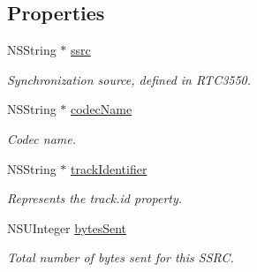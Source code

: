 \subsection*{Properties}
\begin{DoxyCompactItemize}
\item 
\mbox{\label{interface_c_c_video_sender_status_ab86e6b3305daf4898839841bd950a736}} 
N\+S\+String $\ast$ \hyperlink{interface_c_c_video_sender_status_ab86e6b3305daf4898839841bd950a736}{ssrc}
\begin{DoxyCompactList}\small\item\em Synchronization source, defined in R\+T\+C3550. \end{DoxyCompactList}\item 
\mbox{\label{interface_c_c_video_sender_status_a141c850653dd736eb352797c363d366b}} 
N\+S\+String $\ast$ \hyperlink{interface_c_c_video_sender_status_a141c850653dd736eb352797c363d366b}{codec\+Name}
\begin{DoxyCompactList}\small\item\em Codec name. \end{DoxyCompactList}\item 
\mbox{\label{interface_c_c_video_sender_status_ab8fe689cf3ef20a9fa474325896b936b}} 
N\+S\+String $\ast$ \hyperlink{interface_c_c_video_sender_status_ab8fe689cf3ef20a9fa474325896b936b}{track\+Identifier}
\begin{DoxyCompactList}\small\item\em Represents the track.\+id property. \end{DoxyCompactList}\item 
\mbox{\label{interface_c_c_video_sender_status_a8649495115b402a65c03f964b8c4e86c}} 
N\+S\+U\+Integer \hyperlink{interface_c_c_video_sender_status_a8649495115b402a65c03f964b8c4e86c}{bytes\+Sent}
\begin{DoxyCompactList}\small\item\em Total number of bytes sent for this S\+S\+RC. \end{DoxyCompactList}\item 
\mbox{\label{interface_c_c_video_sender_status_abd80886bdd428f289e94db3bb2031689}} 

\end{DoxyCompactItemize}
